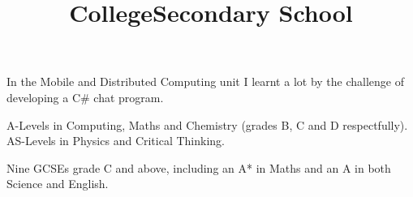 \documentclass[line,margin]{res}
\newcommand{\ampersand}{\&}
\newcommand{\hash}{\#}
\newcommand{\CSharp}{C\hash}
\begin{document}
\begin{resume}
\begin{position}
In the Mobile and Distributed Computing unit I learnt a lot by the challenge of developing a {\CSharp} chat program.
\end{position}

\title{College}
\begin{position}
A-Levels in Computing, Maths and Chemistry (grades B, C and D respectfully). \\
AS-Levels in Physics and Critical Thinking.

\begin{comment}
\begin{tabular}{ l r r }
	Computing & A Level & B \\
	Maths & A Level & C \\
	Chemistry & A Level & D \\
	Physics & AS Level & D \\
	Critical Thinking & AS Level & E \\
\end{tabular}
\end{comment}
\end{position}

\title{Secondary School}
\begin{position}
Nine GCSEs grade C and above, including an A* in Maths and an A in both Science and English.

\begin{comment}
\begin{tabular}{ l r r }
	Mathematics & (a year early) GCSE & A* \\
	Science & Double Award GCSE & AA \\
	English & GCSE & A \\
	History & GCSE & B \\
	Systems {\ampersand} Control & GCSE & B \\
	ICT & Short Course GCSE & C \\
	Statistics & GCSE & C \\
	English Literature & GCSE & C \\
	Geography & GCSE & D \\
	Drama & GCSE & F \\
\end{tabular}
\end{comment}
\end{position}


\end{resume}
\end{document}
